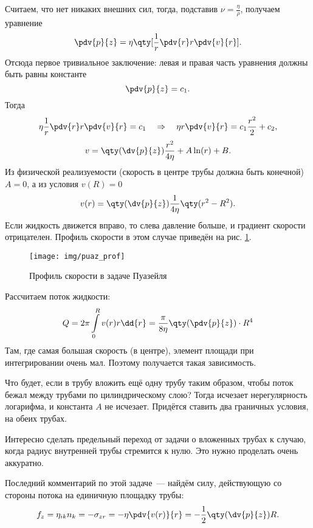 Считаем, что нет никаких внешних сил, тогда, подставив $\nu = \frac{\eta}{\rho}$, получаем уравнение
\begin{equation}
    \pdv{p}{z} = \eta
   \qty[
   \frac{1}{r} \pdv{r} r \pdv{v}{r}
   ].
\end{equation}
Отсюда первое тривиальное заключение: левая и правая часть уравнения должны быть равны константе
\begin{equation}
    \pdv{p}{z} = c_1.
\end{equation}
Тогда
\begin{equation}
    \eta\frac{1}{r} \pdv{r} r \pdv{v}{r} = c_1
    \quad \Rightarrow \quad
    \eta r\pdv{v}{r} = c_1 \frac{r^2}{2} + c_{2},
\end{equation}
\begin{equation}
    v = \qty(\dv{p}{z}) \frac{r^2}{4\eta}+A \ln(r) + B.
\end{equation}
Из физической реализуемости (скорость в центре трубы должна быть конечной) $A = 0$, а из условия $v(R) = 0$
\begin{equation}
    v(r) = \qty(\dv{p}{z}) \frac{1}{4\eta}\qty(r^2-R^2).
\end{equation}
Если жидкость движется вправо, то слева давление больше, и градиент скорости отрицателен. Профиль скорости в этом случае приведён на рис. \ref{fig:puaseil_tech_velo_profile}.
\begin{figure}[H]
    \centering
    \texttt{[image: img/puaz\_prof]}
    \caption{Профиль скорости в задаче Пуазейля}
    \label{fig:puaseil_tech_velo_profile}
\end{figure}
Рассчитаем поток жидкости:
\begin{equation}
    Q=2\pi \int\limits_0^R v(r) r \dd{r} =
    \frac{\pi}{8\eta} \qty(\pdv{p}{z})\cdot R^4
\end{equation}
Там, где самая большая скорость (в центре), элемент площади при интегрировании очень мал. Поэтому получается такая зависимость.

Что будет, если в трубу вложить ещё одну трубу таким образом, чтобы поток бежал между трубами по цилиндрическому слою? Тогда исчезает нерегулярность логарифма, и константа $A$ не исчезает. Придётся ставить два граничных условия, на обеих трубах.

Интересно сделать предельный переход от задачи о вложенных трубах к случаю, когда радиус внутренней трубы  стремится к нулю. Это нужно проделать очень аккуратно.

Последний комментарий по этой задаче~--- найдём силу, действующую со стороны потока на единичную площадку трубы:
\begin{equation}
    f_z = \eta_{ik} n_k = -\sigma_{zr} = -\eta \pdv{v(r)}{r}=
    -\frac{1}{2} \qty(\dv{p}{z})R.
\end{equation}

